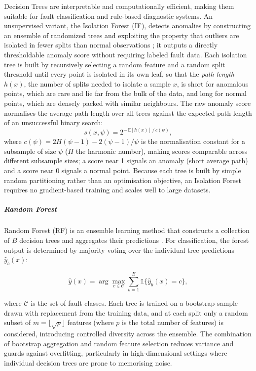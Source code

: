 Decision Trees are interpretable and computationally efficient, making them suitable for fault classification and rule-based diagnostic systems. An unsupervised variant, the Isolation Forest (IF), detects anomalies by constructing an ensemble of randomized trees and exploiting the property that outliers are isolated in fewer splits than normal observations \citep{liu2008isolation}; it outputs a directly thresholdable anomaly score without requiring labeled fault data. Each isolation tree is built by recursively selecting a random feature and a random split threshold until every point is isolated in its own leaf, so that the \emph{path length} $h(x)$, the number of splits needed to isolate a sample $x$, is short for anomalous points, which are rare and lie far from the bulk of the data, and long for normal points, which are densely packed with similar neighbours. The raw anomaly score normalises the average path length over all trees against the expected path length of an unsuccessful binary search:
\begin{equation}
    s(x,\psi) = 2^{-\,\mathbb{E}[h(x)]\,/\,c(\psi)},
\end{equation}
where $c(\psi) = 2H(\psi-1) - 2(\psi-1)/\psi$ is the normalisation constant for a subsample of size $\psi$ ($H$ the harmonic number), making scores comparable across different subsample sizes; a score near 1 signals an anomaly (short average path) and a score near 0 signals a normal point. Because each tree is built by simple random partitioning rather than an optimisation objective, an Isolation Forest requires no gradient-based training and scales well to large datasets.

\subparagraph{Random Forest}

Random Forest (RF) is an ensemble learning method that constructs a collection of $B$ decision trees and aggregates their predictions \citep{breiman2001random}. For classification, the forest output is determined by majority voting over the individual tree predictions $\hat{y}_b(x)$:

\begin{equation}
\hat{y}(x) = \arg\max_{c \in \mathcal{C}} \sum_{b=1}^{B} \mathbb{1}\{\hat{y}_b(x) = c\},
\end{equation}

where $\mathcal{C}$ is the set of fault classes. Each tree is trained on a bootstrap sample drawn with replacement from the training data, and at each split only a random subset of $m = \lfloor\sqrt{p}\rfloor$ features (where $p$ is the total number of features) is considered, introducing controlled diversity across the ensemble. The combination of bootstrap aggregation and random feature selection reduces variance and guards against overfitting, particularly in high-dimensional settings where individual decision trees are prone to memorising noise.

